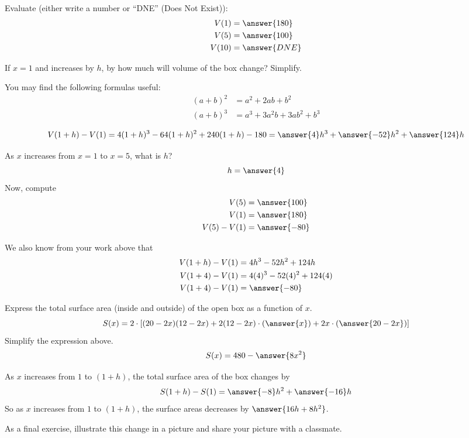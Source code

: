 \documentclass{ximera}
\begin{document}
\begin{exercise}
  Evaluate (either write a number or ``DNE'' (Does Not Exist)):
  \begin{align*}
    V(1) &= \answer{180}\\
    V(5) &= \answer{100}\\
    V(10) &= \answer{DNE}
  \end{align*}
\end{exercise}
\begin{exercise}
  If $x = 1$ and increases by $h$, by how much will volume of the box change? Simplify.
  \begin{hint}
    You may find the following formulas useful:
    \begin{align*}
      (a+b)^2 &= a^2 + 2ab + b^2\\
      (a + b)^3 &= a^3 + 3 a^2 b + 3 ab^2 + b^3
    \end{align*}
  \end{hint}
  \[
  V(1+h) - V(1) =4(1+h)^3 -64(1+h)^2 +240(1+h)-180=\answer{4}h^3 +\answer{-52}h^2 + \answer{124}h
  \]
\end{exercise}

\begin{exercise}
  As $x$ increases from $x=1$ to $x=5$, what is $h$?
  \[
  h=\answer{4}
  \]
  Now, compute
  \begin{align*}
    V(5) &= \answer{100}\\
    V(1) &= \answer{180}\\
    V(5) - V(1) &= \answer{-80}
  \end{align*}
  \begin{exercise}
    We also know from your work above that
    \begin{align*}
      V(1+h) -V(1) &= 4h^3 -52h^2 + 124h\\
      V(1+4) -V(1) &= 4(4)^3 -52(4)^2 + 124(4)\\
      V(1+4) - V(1) &= \answer{-80}
    \end{align*}
  \end{exercise}
\end{exercise}

\begin{exercise}
  Express the total surface area (inside and outside) of the open box
  as a function of $x$.
  \[
  S(x) = 2\cdot\left[(20-2x)(12-2x)+2(12-2x)\cdot\left(\answer{x}\right)+2x\cdot\left(\answer{20-2x}\right)\right]
  \]
  Simplify the expression above.
  \[
  S(x) =480- \answer{8x^2}
  \]
\end{exercise}
\begin{exercise}
  As $x$ increases from $1$ to $(1+h)$, the total surface area of the
  box changes by
  \[
  S(1+h) - S(1) = \answer{-8}h^2 + \answer{-16}h
  \]
  So as $x$ increases from $1$ to  $(1+h)$, the surface areas decreases by
  $\answer{16h+8h^2}$.

  As a final exercise, illustrate this change in a picture and share your picture with a classmate.
  \begin{multipleChoice}
  \end{multipleChoice}
\end{exercise}
\end{document}
